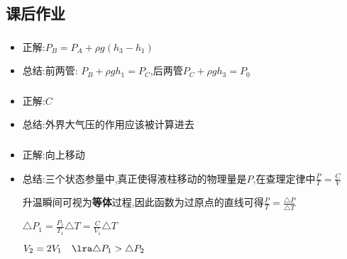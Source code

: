 \documentclass{article}
\begin{document}
\subsection{课后作业}
\subsubsection{}
\begin{itemize}
    \item 正解:\quad $P_{B} = P_{A} + \rho g (h_{3} - h_{1}) $
    \item 总结:\quad 前两管: $ P_{B} + \rho g h_{1} = P_{C}\text{,后两管} P_{C} + \rho g h_{3} = P_{0}$
\end{itemize}

\vspace{2em}

\subsubsection{}
\begin{itemize}
    \item 正解:\quad $C$
    \item 总结:\quad 外界大气压的作用应该被计算进去
\end{itemize}

\vspace{2em}

\subsubsection{}
\begin{itemize}
    \item 正解:\quad 向上移动
    \item 总结:\quad 三个状态参量中,真正使得液柱移动的物理量是$P$,在查理定律中$\frac{P}{T} = \frac{C}{V}$

          \hspace{3.3em}升温瞬间可视为\textbf{等体}过程,因此函数为过原点的直线可得$\frac{P}{T} = \frac{\triangle P}{\triangle T}$

          \hspace{3.3em}$ \triangle P_{1} = \frac{P_{1}}{T_{1}} \triangle T = \frac{C}{V_{1}} \triangle T $

          \hspace{3.3em}$ V_{2} = 2 V_{1}  \quad \lra \triangle P_{1} > \triangle P_{2}$
\end{itemize}

\vspace{2em}
\end{document}

